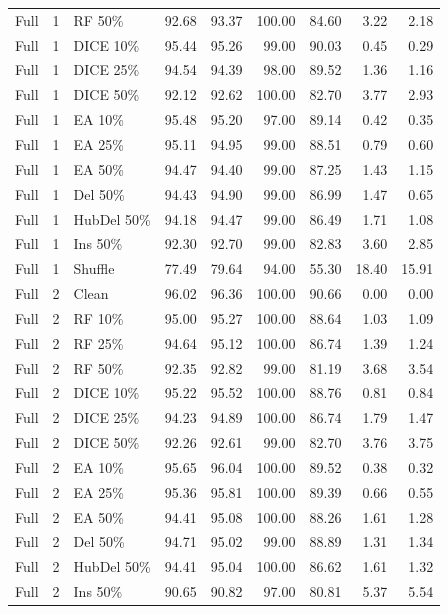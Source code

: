 {\begin{longtable}{rllrrrrrr}
Full & 1 & RF 50\% & 92.68 & 93.37 & 100.00 & 84.60 & 3.22 & 2.18 \\
Full & 1 & DICE 10\% & 95.44 & 95.26 & 99.00 & 90.03 & 0.45 & 0.29 \\
Full & 1 & DICE 25\% & 94.54 & 94.39 & 98.00 & 89.52 & 1.36 & 1.16 \\
Full & 1 & DICE 50\% & 92.12 & 92.62 & 100.00 & 82.70 & 3.77 & 2.93 \\
Full & 1 & EA 10\% & 95.48 & 95.20 & 97.00 & 89.14 & 0.42 & 0.35 \\
Full & 1 & EA 25\% & 95.11 & 94.95 & 99.00 & 88.51 & 0.79 & 0.60 \\
Full & 1 & EA 50\% & 94.47 & 94.40 & 99.00 & 87.25 & 1.43 & 1.15 \\
Full & 1 & Del 50\% & 94.43 & 94.90 & 99.00 & 86.99 & 1.47 & 0.65 \\
Full & 1 & HubDel 50\% & 94.18 & 94.47 & 99.00 & 86.49 & 1.71 & 1.08 \\
Full & 1 & Ins 50\% & 92.30 & 92.70 & 99.00 & 82.83 & 3.60 & 2.85 \\
Full & 1 & Shuffle & 77.49 & 79.64 & 94.00 & 55.30 & 18.40 & 15.91 \\
Full & 2 & Clean & 96.02 & 96.36 & 100.00 & 90.66 & 0.00 & 0.00 \\
Full & 2 & RF 10\% & 95.00 & 95.27 & 100.00 & 88.64 & 1.03 & 1.09 \\
Full & 2 & RF 25\% & 94.64 & 95.12 & 100.00 & 86.74 & 1.39 & 1.24 \\
Full & 2 & RF 50\% & 92.35 & 92.82 & 99.00 & 81.19 & 3.68 & 3.54 \\
Full & 2 & DICE 10\% & 95.22 & 95.52 & 100.00 & 88.76 & 0.81 & 0.84 \\
Full & 2 & DICE 25\% & 94.23 & 94.89 & 100.00 & 86.74 & 1.79 & 1.47 \\
Full & 2 & DICE 50\% & 92.26 & 92.61 & 99.00 & 82.70 & 3.76 & 3.75 \\
Full & 2 & EA 10\% & 95.65 & 96.04 & 100.00 & 89.52 & 0.38 & 0.32 \\
Full & 2 & EA 25\% & 95.36 & 95.81 & 100.00 & 89.39 & 0.66 & 0.55 \\
Full & 2 & EA 50\% & 94.41 & 95.08 & 100.00 & 88.26 & 1.61 & 1.28 \\
Full & 2 & Del 50\% & 94.71 & 95.02 & 99.00 & 88.89 & 1.31 & 1.34 \\
Full & 2 & HubDel 50\% & 94.41 & 95.04 & 100.00 & 86.62 & 1.61 & 1.32 \\
Full & 2 & Ins 50\% & 90.65 & 90.82 & 97.00 & 80.81 & 5.37 & 5.54 \\

\end{longtable}}
